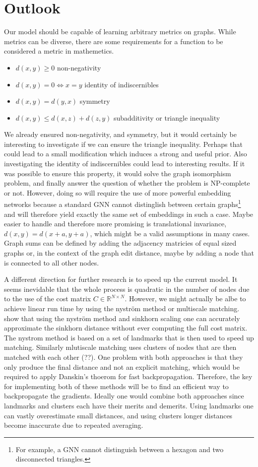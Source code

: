 \section{Outlook}

Our model should be capable of learning arbitrary metrics on graphs. While metrics can be diverse, there are some requirements for a function to be considered a metric in mathemetics.
\begin{itemize}
    \itemsep0em
    \item $d(x,y) \ge 0$ non-negativity
    \item $d(x,y) = 0 \Leftrightarrow x = y$ identity of indiscernibles
    \item $d(x,y)  = d(y,x)$ symmetry
    \item $d(x,y) \le d(x,z) + d(z, y)$ subadditivity or triangle inequality
\end{itemize}
We already ensured non-negativity, and symmetry, but it would certainly be interesting to investigate if we can ensure the triangle inequality. Perhaps that could lead to a small modification which induces a strong and useful prior. Also investigating the identity of indiscernibles could lead to interesting results. If it was possible to ensure this property, it would solve the graph isomorphism problem, and finally answer the question of whether the problem is NP-complete or not. However, doing so will require the use of more powerful embedding networks because a standard GNN cannot distinglish between certain graphs\footnote{For example, a GNN cannot distinguish between a hexagon and two disconnected triangles.} and will therefore yield exactly the same set of embeddings in such a case. Maybe easier to handle and therefore more promising is translational invariance, $d(x,y) = d(x+a,y+a)$, which might be a valid assumptions in many cases. Graph sums can be defined by adding the adjacency matricies of equal sized graphs \cite{graph_sum2004} or, in the context of the graph edit distance, maybe by adding a node that is connected to all other nodes.

A different direction for further research is to speed up the current model. It seems inevidable that the whole process is quadratic in the number of nodes due to the use of the cost matrix $C \in \mathbb{R}^{N \times N}$. However, we might actually be albe to achieve linear run time by using the nystr{\"{o}}m method or multiscale matching. \cite{nytrom2019} show that using the nystr{\"{o}}m method and sinkhorn scaling one can accurately approximate the sinkhorn distance without ever computing the full cost matrix. The nystrom method is based on a set of landmarks that is then used to speed up matching. Similarly mlutiscale matching uses clusters of nodes that are then matched with each other  (\citealp{}??). One problem with both approaches is that they only produce the final distance and not an explicit matching, which would be required to apply Danskin's thoerom for fast backpropagation. Therefore, the key for implementing both of these methods will be to find an efficient way to backpropagate the gradients. Ideally one would combine both approaches since landmarks and clusters each have their merits and demerits. Using landmarks one can vastly overestimate small distances, and using clusters longer distances become inaccurate due to repeated averaging.
